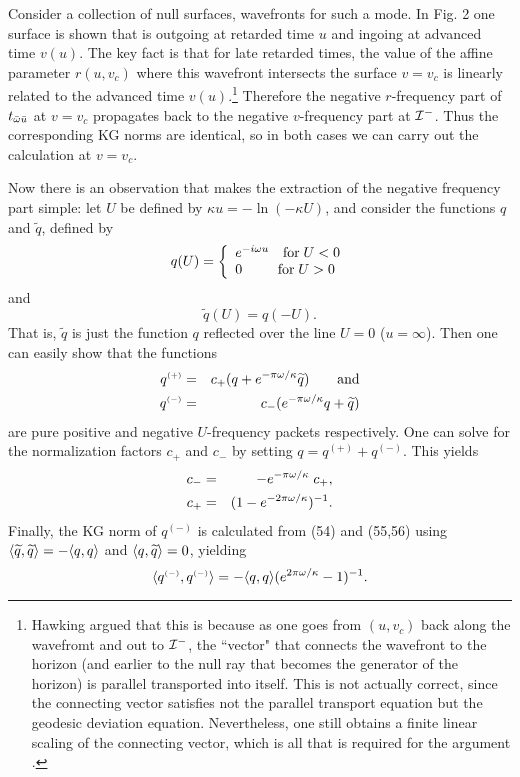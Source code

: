 Consider a collection of null surfaces, wavefronts for such a mode.
In Fig. 2 one surface is shown that is outgoing at
retarded time $u$ and ingoing at advanced time $v(u)$. The
key fact is that for late retarded times,
the value of the affine parameter $r(u,v_c)$ where this
wavefront intersects the surface $v=v_c$ is linearly
related to the advanced time $v(u)$.\footnote{Hawking
argued that this is because as one goes from $(u,v_c)$ back
along the wavefromt and out to ${\cal I}^-$, the ``vector" that
connects the wavefront to the horizon (and earlier to the null
ray that becomes the generator of the horizon) is parallel
transported into itself. This is not actually correct, since
the connecting vector satisfies not the parallel transport
equation but the geodesic deviation equation. Nevertheless,
one still obtains a finite linear scaling of the connecting vector,
which is all that is required for the argument \cite{WaldGR}.}
Therefore the negative
$r$-frequency part of $t_{\bar{\omega}\bar{u}}$ at $v=v_c$ propagates
back to the negative $v$-frequency part at ${\cal I}^-$. Thus
the corresponding KG norms are identical, so in both cases
we can carry out the calculation at $v=v_c$.

Now there is an observation \cite{Notes,Wald75} that makes the
extraction of the negative frequency part simple: let
$U$ be defined by $\kappa u=-\ln(-\kappa U)$, and consider
the functions $q$ and $\widetilde q$, defined by
\begin{equation}
q(U)=\left\{
\begin{array}{l}
e^{-i\omega u} \quad {\rm for}\;  U<0\\
0\quad\quad\; \; {\rm for}\;  U>0
\end{array}\right.
\end{equation}
and
\begin{equation}\widetilde{q}(U)=q(-U).
\end{equation}
That is, $\widetilde q$ is just the function $q$ reflected over
the line $U=0$ ($u=\infty$). Then one can easily show that
the functions
\begin{eqnarray}
q^{\scriptscriptstyle(+)}&=&c_{+}
(q+e^{-\pi\omega/\kappa}\widetilde{q})
\qquad {\rm and}\label{q+}\\
q^{\scriptscriptstyle(-)}&=&c_{-}
(e^{-\pi\omega/\kappa}q+\widetilde{q})
\end{eqnarray}
are pure positive and negative $U$-frequency packets
respectively. One can solve for the normalization factors
$c_{+}$ and $c_{-}$ by setting
$q=q^{\scriptscriptstyle(+)}+q^{\scriptscriptstyle(-)}$.
This yields
\begin{eqnarray}
c_{-}&=&-e^{-\pi\omega/\kappa}\; c_{+},\\
c_{+}&=&(1-e^{-2\pi\omega/\kappa})^{-1}.
\end{eqnarray}
Finally, the KG norm of $q^{\scriptscriptstyle(-)}$ is
calculated from (54) and (55,56) using
$\langle\widetilde{q},\widetilde{q}\rangle=-\langle q,q\rangle$ and $\langle
q,\widetilde{q}\rangle=0$, yielding
\begin{equation}
\langle q^{\scriptscriptstyle(-)},q^{\scriptscriptstyle(-)}\rangle
=-\langle q,q\rangle (e^{2\pi\omega/\kappa}-1)^{-1}.
\end{equation}

